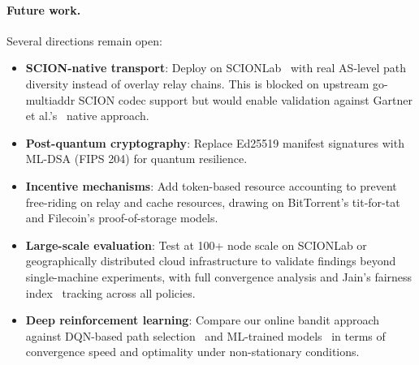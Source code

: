 \documentclass[sigconf,nonacm]{acmart}
\begin{document}
\paragraph{Future work.} Several directions remain open:
\begin{itemize}
\item \textbf{SCION-native transport}: Deploy on SCIONLab~\cite{kwon2020scionlab} with real AS-level path diversity instead of overlay relay chains. This is blocked on upstream go-multiaddr SCION codec support but would enable validation against Gartner et al.'s~\cite{gartner2025ipfs} native approach.
\item \textbf{Post-quantum cryptography}: Replace Ed25519 manifest signatures with ML-DSA (FIPS 204) for quantum resilience.
\item \textbf{Incentive mechanisms}: Add token-based resource accounting to prevent free-riding on relay and cache resources, drawing on BitTorrent's tit-for-tat~\cite{cohen2003incentives} and Filecoin's proof-of-storage models.
\item \textbf{Large-scale evaluation}: Test at 100+ node scale on SCIONLab or geographically distributed cloud infrastructure to validate findings beyond single-machine experiments, with full convergence analysis and Jain's fairness index~\cite{jain1984quantitative} tracking across all policies.
\item \textbf{Deep reinforcement learning}: Compare our online bandit approach against DQN-based path selection~\cite{sciondqnsim2025} and ML-trained models~\cite{scionpathml2025} in terms of convergence speed and optimality under non-stationary conditions.
\end{itemize}



\end{document}

